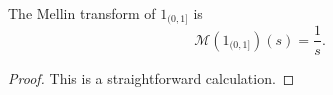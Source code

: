 \begin{theorem}[MellinOf1]
\label{MellinOf1}
\leanok
The Mellin transform of $1_{(0,1]}$ is
  $$\mathcal{M}(1_{(0,1]})(s) = \frac{1}{s}.$$
\end{theorem}
\begin{proof}
\leanok
This is a straightforward calculation.
\end{proof}
